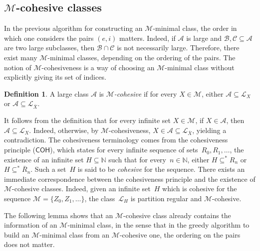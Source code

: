 \documentclass{article}
\def\NN{\mathbb{N}}
\def\U{\mathcal{U}}
\def\C{\mathcal{C}}
\def\A{\mathcal{A}}
\def\B{\mathcal{B}}
\def\M{\mathcal{M}}
\renewcommand{\L}[0]{\mathcal{L}}
\newcommand{\COH}{\mathsf{COH}}
\numberwithin{theorem}{section}
\newtheorem{lemma}[theorem]{Lemma}
\theoremstyle{definition}
\newtheorem{definition}[theorem]{Definition}
\begin{document}



\subsection{$\M$-cohesive classes}

In the previous algorithm for constructing an $\M$-minimal class, the order in which one considers the pairs $(e, i)$ matters. Indeed, if $\A$ is large and $\B, \C \subseteq \A$ are two large subclasses, then $\B \cap \C$ is not necessarily large. Therefore, there exist many $\M$-minimal classes, depending on the ordering of the pairs. The notion of $\M$-cohesiveness is a way of choosing an $\M$-minimal class without explicitly giving its set of indices.

\begin{definition}
    A large class $\A$ is \emph{$\M$-cohesive} if for every $X \in \M$, either $\A \subseteq \L_X$ or $\A \subseteq \L_{\overline{X}}$.
\end{definition}

It follows from the definition that for every infinite set $X \in \M$, if $X \in \A$, then $\A \subseteq \L_X$.
Indeed, otherwise, by $\M$-cohesiveness, $X \in \A \subseteq \L_{\overline{X}}$, yielding a contradiction.
The cohesiveness terminology comes from the cohesiveness principle ($\COH$), which states for every infinite sequence of sets~$R_0, R_1, \dots$, the existence of an infinite set $H \subseteq \NN$ such that for every~$n \in \NN$, either $H \subseteq^* R_n$ or $H \subseteq^* \overline{R}_n$. Such a set~$H$ is said to be \emph{cohesive} for the sequence. There exists an immediate correspondence between the cohesiveness principle and the existence of $\M$-cohesive classes. Indeed, given an infinite set~$H$ which is cohesive for the sequence $\M = \{Z_0, Z_1, \dots \}$,
the class~$\L_H$ is partition regular and $\M$-cohesive. 

The following lemma shows that an $\M$-cohesive class already contains the information of an $\M$-minimal class, in the sense that in the greedy algorithm to build an $\M$-minimal class from an $\M$-cohesive one, the ordering on the pairs does not matter.
\end{document}
